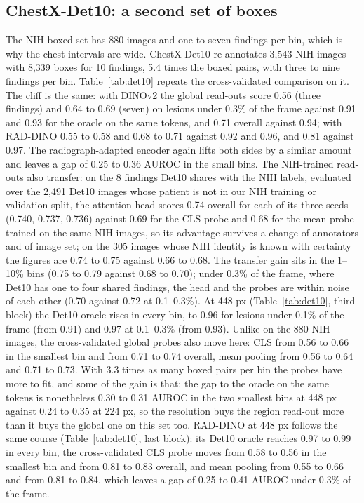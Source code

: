 \documentclass[10pt,letterpaper,twocolumn]{article}
\begin{document}
\subsection{ChestX-Det10: a second set of boxes}
\label{sec:det10}
The NIH boxed set has 880 images and one to seven findings per bin, which is why the chest
intervals are wide. ChestX-Det10 re-annotates 3,543 NIH images with 8,339 boxes for 10
findings, 5.4 times the boxed pairs, with three to nine findings per bin. Table~\ref{tab:det10}
repeats the cross-validated comparison on it. The cliff is the same: with DINOv2 the global
read-outs score 0.56 (three findings) and 0.64 to 0.69 (seven) on lesions under 0.3\% of the
frame against 0.91 and 0.93 for the oracle on the same tokens, and 0.71 overall against 0.94;
with RAD-DINO 0.55 to 0.58 and 0.68 to 0.71 against 0.92 and 0.96, and 0.81 against 0.97. The
radiograph-adapted encoder again lifts both sides by a similar amount and leaves a gap of
0.25 to 0.36 AUROC in the small bins. The NIH-trained read-outs also transfer: on the 8 findings
Det10 shares with the NIH labels, evaluated over the 2,491 Det10 images whose patient is not
in our NIH training or validation split, the attention head scores 0.74 overall for each of
its three seeds (0.740, 0.737, 0.736) against 0.69 for the CLS probe and 0.68 for the mean
probe trained on the same NIH images, so its advantage survives a change of annotators and
of image set; on the 305 images whose NIH identity is known with certainty the figures are
0.74 to 0.75 against 0.66 to 0.68. The transfer gain sits in the 1--10\% bins (0.75 to 0.79
against 0.68 to 0.70); under 0.3\% of the frame, where Det10 has one to four shared findings,
the head and the probes are within noise of each other (0.70 against 0.72 at 0.1--0.3\%).
At 448 px (Table~\ref{tab:det10}, third block) the Det10 oracle rises in every bin, to 0.96 for
lesions under 0.1\% of the frame (from 0.91) and 0.97 at 0.1--0.3\% (from 0.93). Unlike on
the 880 NIH images, the cross-validated global probes also move here: CLS from 0.56 to 0.66 in
the smallest bin and from 0.71 to 0.74 overall, mean pooling from 0.56 to 0.64 and 0.71 to
0.73. With 3.3 times as many boxed pairs per bin the probes have more to fit, and some of the
gain is that; the gap to the oracle on the same tokens is nonetheless 0.30 to 0.31 AUROC in
the two smallest bins at 448 px against 0.24 to 0.35 at 224 px, so the resolution buys the
region read-out more than it buys the global one on this set too.
RAD-DINO at 448 px follows the same course (Table~\ref{tab:det10}, last block): its Det10
oracle reaches 0.97 to 0.99 in every bin, the cross-validated CLS probe moves from 0.58 to 0.56
in the smallest bin and from 0.81 to 0.83 overall, and mean pooling from 0.55 to 0.66 and from
0.81 to 0.84, which leaves a gap of 0.25 to 0.41 AUROC under 0.3\% of the frame.
\end{document}
